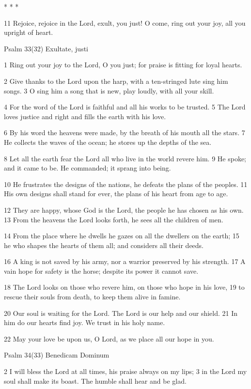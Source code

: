 * * *

11 Rejoice, rejoice in the Lord,
exult, you just!
O come, ring out your joy,
all you upright of heart.


Psalm 33(32) Exultate, justi

1 Ring out your joy to the Lord, O you just;
for praise is fitting for loyal hearts.

2 Give thanks to the Lord upon the harp,
with a ten-stringed lute sing him songs.
3 O sing him a song that is new,
play loudly, with all your skill.

4 For the word of the Lord is faithful
and all his works to be trusted.
5 The Lord loves justice and right
and fills the earth with his love.

6 By his word the heavens were made,
by the breath of his mouth all the stars.
7 He collects the waves of the ocean;
he stores up the depths of the sea.

8 Let all the earth fear the Lord
all who live in the world revere him.
9 He spoke; and it came to be.
He commanded; it sprang into being.

10 He frustrates the designs of the nations,
he defeats the plans of the peoples.
11 His own designs shall stand for ever,
the plans of his heart from age to age.

12 They are happy, whose God is the Lord,
the people he has chosen as his own.
13 From the heavens the Lord looks forth,
he sees all the children of men.

14 From the place where he dwells he gazes
on all the dwellers on the earth;
15 he who shapes the hearts of them all;
and considers all their deeds.

16 A king is not saved by his army,
nor a warrior preserved by his strength.
17 A vain hope for safety is the horse;
despite its power it cannot save.

18 The Lord looks on those who revere him,
on those who hope in his love,
19 to rescue their souls from death,
to keep them alive in famine.

20 Our soul is waiting for the Lord.
The Lord is our help and our shield.
21 In him do our hearts find joy.
We trust in his holy name.

22 May your love be upon us, O Lord,
as we place all our hope in you.


Psalm 34(33) Benedicam Dominum

2 I will bless the Lord at all times,
his praise always on my lips;
3 in the Lord my soul shall make its boast.
The humble shall hear and be glad.


